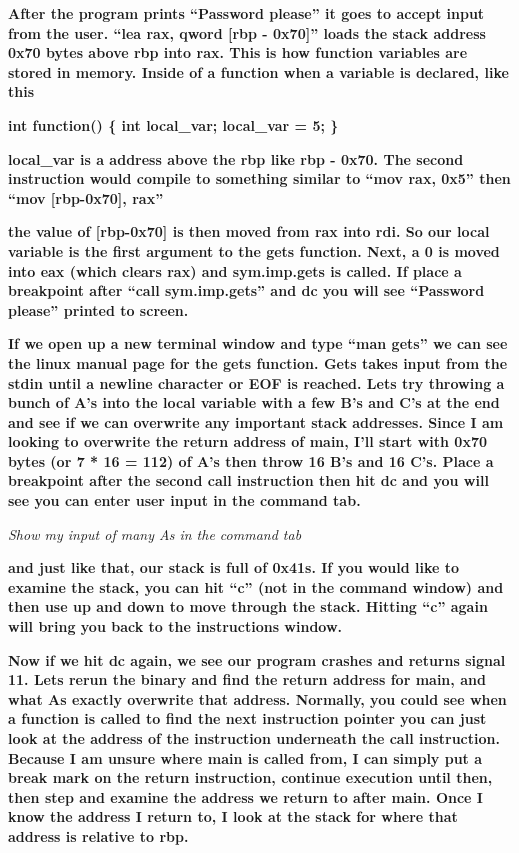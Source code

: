 \documentclass[letterpaper]{article}
\newcommand{\sitfig}[3]{
\begin{figure}[H]
\centering
\makebox[\textwidth][c]{
#2
}
\label{#1}
\end{figure}
}
\newcommand{\sitgfx}[4][scale=1.0]{
\sitfig{#3}{\texttt{[image: \#2]}}{#4}
}
\begin{document}
  
\sitgfx[width=5.8335in,height=3.6457in]{reversing-img090.png}{fig:unk}{TODO CAPTION}
 

\textbf{After the program prints ``Password please'' it goes to accept input from the user. ``lea rax, qword [rbp -
0x70]'' loads the stack address 0x70 bytes above rbp into rax. This is how function variables are stored in memory.
Inside of a function when a variable is declared, like this}

\textbf{int function() \{ int local\_var; local\_var = 5; \}}

\textbf{local\_var is a address above the rbp like rbp - 0x70. The second instruction would compile to something similar
to ``mov rax, 0x5'' then ``mov [rbp-0x70], rax''}

\textbf{the value of [rbp-0x70] is then moved from rax into rdi. So our local variable is the first argument to the gets
function. Next, a 0 is moved into eax (which clears rax) and sym.imp.gets is called. If place a breakpoint after ``call
sym.imp.gets'' and dc you will see ``Password please'' printed to screen.}

  
\sitgfx[width=5.8335in,height=2.9654in]{reversing-img091.png}{fig:unk}{TODO CAPTION}
 

\textbf{If we open up a new terminal window and type ``man gets'' we can see the linux manual page for the gets
function. Gets takes input from the stdin until a newline character or EOF is reached. Lets try throwing a bunch of A's
into the local variable with a few B's and C's at the end and see if we can overwrite any important stack addresses.
Since I am looking to overwrite the return address of main, I'll start with 0x70 bytes (or 7 * 16 = 112) of A's then
throw 16 B's and 16 C's. Place a breakpoint after the second call instruction then hit dc and you will see you can
enter user input in the command tab.}

  
\sitgfx[width=5.8335in,height=3.6457in]{reversing-img092.png}{fig:unk}{TODO CAPTION}
 

\textit{Show my input of many As in the command tab}

\textbf{and just like that, our stack is full of 0x41s. If you would like to examine the stack, you can hit ``c'' (not
in the command window) and then use up and down to move through the stack. Hitting ``c'' again will bring you back to
the instructions window.}

  
\sitgfx[width=5.8335in,height=3.6457in]{reversing-img093.png}{fig:unk}{TODO CAPTION}
 

\textbf{Now if we hit dc again, we see our program crashes and returns signal 11. Lets rerun the binary and find the
return address for main, and what As exactly overwrite that address. Normally, you could see when a function is called
to find the next instruction pointer you can just look at the address of the instruction underneath the call
instruction. Because I am unsure where main is called from, I can simply put a break mark on the return instruction,
continue execution until then, then step and examine the address we return to after main. Once I know the address I
return to, I look at the stack for where that address is relative to rbp.}
\end{document}
